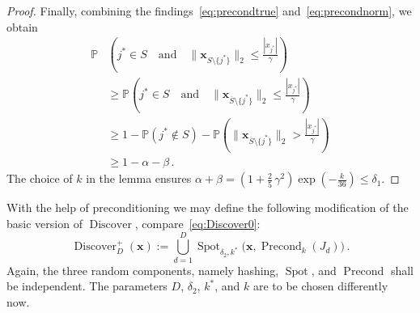 \documentclass[12pt]{article}
\theoremstyle{plain}
\theoremstyle{definition}
\renewcommand{\P}{{\mathbb P}}
\renewcommand{\vec}{\boldsymbol}
\DeclareMathOperator{\precond}{Precond}
\DeclareMathOperator{\spot}{Spot}
\DeclareMathOperator{\discover}{Discover} %
\begin{document}
\begin{proof}
    Finally, combining the findings~\eqref{eq:precondtrue} and~\eqref{eq:precondnorm}, we obtain
    \begin{align*}
        \P&\left( j^\ast \in S \quad \text{and} \quad
            \|\vec{x}_{S \setminus\{j^\ast\}}\|_2 \leq \frac{|x_{j^\ast}|}{\gamma}
            \right) \\
            &\geq \P\left( j^\ast \in S \quad \text{and} \quad
            \|\vec{x}_{\overline{S} \setminus\{j^\ast\}}\|_2 \leq \frac{|x_{j^\ast}|}{\gamma}
            \right) \\
            &\geq 1 - \P\left( j^\ast \notin S\right)
                    - \P\left(\|\vec{x}_{\overline{S} \setminus\{j^\ast\}}\|_2 > \frac{|x_{j^\ast}|}{\gamma}\right) \\
            &\geq 1 - \alpha - \beta \,.
    \end{align*}
    The choice of $k$ in the lemma ensures
    $\alpha + \beta = \left(1 + \frac{2}{5} \, \gamma^2\right) \exp\left(-\frac{k}{36}\right) \leq \delta_1$.
\end{proof}

With the help of preconditioning we may define the following modification of the basic version of $\discover$, compare~\eqref{eq:Discover0}:
\begin{equation} \label{eq:discover+}
    \discover_D^+(\vec{x}) := \bigcup_{d = 1}^{D} \spot_{\delta_2,k^\ast}\bigl(\vec{x},\precond_k(J_d)\bigr) \,.
\end{equation}
Again, the three random components, namely hashing, $\spot$, and $\precond$ shall be independent.
The parameters $D$, $\delta_2$, $k^\ast$, and $k$ are to be chosen differently now.
\end{document}
